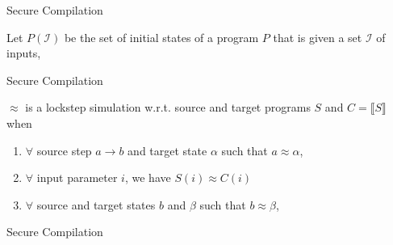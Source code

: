 \begin{frame}{Secure Compilation}
\begin{definition}
    Let $P(\mathcal{I})$ be the set of initial states of a
    program $P$ that is given a set $\mathcal{I}$ of inputs,
\end{definition}
\end{frame}

\begin{frame}{Secure Compilation}
\begin{definition}
    $\approx$ is a lockstep simulation w.r.t. source and
    target programs $S$ and $C = \llbracket S\rrbracket$ when
    \begin{enumerate}
        \item<only@2-> $\forall$ source step $a \to b$ and
        target state $\alpha$ such that
        $a \approx \alpha$,

        \item<only@3-> $\forall$ input parameter $i$,
        we have $S(i) \approx C(i)$
        
        \item<only@4-> $\forall$ source and target states
        $b$ and $\beta$ such that $b \approx \beta$,
    \end{enumerate}
\end{definition}
\end{frame}

\begin{frame}{Secure Compilation}

\end{frame}

